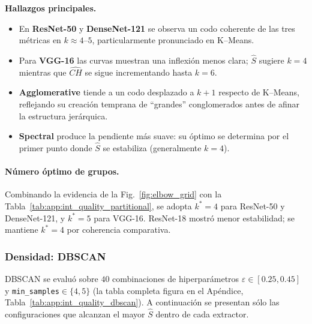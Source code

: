 \vspace{1ex}
\noindent\textbf{Hallazgos principales.}
\begin{itemize}
  \item En \textbf{ResNet-50} y \textbf{DenseNet-121} se observa un codo
        coherente de las tres métricas en \(k\approx4\)–\(5\),
        particularmente pronunciado en K–Means.
  \item Para \textbf{VGG-16} las curvas muestran una inflexión menos clara;
        \(\widehat S\) sugiere \(k=4\) mientras que \(\widehat{CH}\) se sigue
        incrementando hasta \(k=6\).
  \item \textbf{Agglomerative} tiende a un codo desplazado a
        \(k+1\) respecto de K–Means, reflejando su creación temprana de
        “grandes” conglomerados antes de afinar la estructura jerárquica.
  \item \textbf{Spectral} produce la pendiente más suave: su óptimo se
        determina por el primer punto donde
        \(\widehat S\) se estabiliza (generalmente \(k=4\)).
\end{itemize}

\vspace{1ex}
\paragraph{Número óptimo de grupos.}
Combinando la evidencia de la Fig.~\ref{fig:elbow_grid} con
la Tabla~\ref{tab:app:int_quality_partitional}, se adopta \(k^\ast=4\) para
ResNet-50 y DenseNet-121, y \(k^\ast=5\) para VGG-16.
ResNet-18 mostró menor estabilidad; se mantiene \(k^\ast=4\) por coherencia
comparativa.

\subsubsection{Densidad: DBSCAN}

DBSCAN se evaluó sobre \(40\) combinaciones de hiperparámetros
\(\varepsilon\in[0.25,0.45]\) y \texttt{min\_samples}\(\in\{4,5\}\)
(la tabla completa figura en el
Apéndice, Tabla~\ref{tab:app:int_quality_dbscan}).
A continuación se presentan sólo las configuraciones que
alcanzan el mayor \(\widehat S\) dentro de cada extractor.

